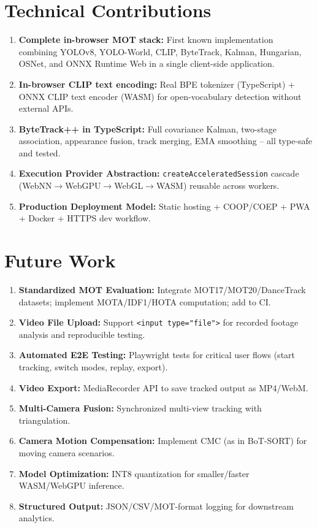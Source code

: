 \section{Technical Contributions}
\label{sec:contributions}

\begin{enumerate}
    \item \textbf{Complete in-browser MOT stack:} First known implementation combining YOLOv8, YOLO-World, CLIP, ByteTrack, Kalman, Hungarian, OSNet, and ONNX Runtime Web in a single client-side application.
    \item \textbf{In-browser CLIP text encoding:} Real BPE tokenizer (TypeScript) + ONNX CLIP text encoder (WASM) for open-vocabulary detection without external APIs.
    \item \textbf{ByteTrack++ in TypeScript:} Full covariance Kalman, two-stage association, appearance fusion, track merging, EMA smoothing -- all type-safe and tested.
    \item \textbf{Execution Provider Abstraction:} \texttt{createAcceleratedSession} cascade (WebNN$\to$WebGPU$\to$WebGL$\to$WASM) reusable across workers.
    \item \textbf{Production Deployment Model:} Static hosting + COOP/COEP + PWA + Docker + HTTPS dev workflow.
\end{enumerate}

\section{Future Work}
\label{sec:future-work}

\begin{enumerate}
    \item \textbf{Standardized MOT Evaluation:} Integrate MOT17/MOT20/DanceTrack datasets; implement MOTA/IDF1/HOTA computation; add to CI.
    \item \textbf{Video File Upload:} Support \texttt{<input type="file">} for recorded footage analysis and reproducible testing.
    \item \textbf{Automated E2E Testing:} Playwright tests for critical user flows (start tracking, switch modes, replay, export).
    \item \textbf{Video Export:} MediaRecorder API to save tracked output as MP4/WebM.
    \item \textbf{Multi-Camera Fusion:} Synchronized multi-view tracking with triangulation.
    \item \textbf{Camera Motion Compensation:} Implement CMC (as in BoT-SORT) for moving camera scenarios.
    \item \textbf{Model Optimization:} INT8 quantization for smaller/faster WASM/WebGPU inference.
    \item \textbf{Structured Output:} JSON/CSV/MOT-format logging for downstream analytics.
\end{enumerate}

